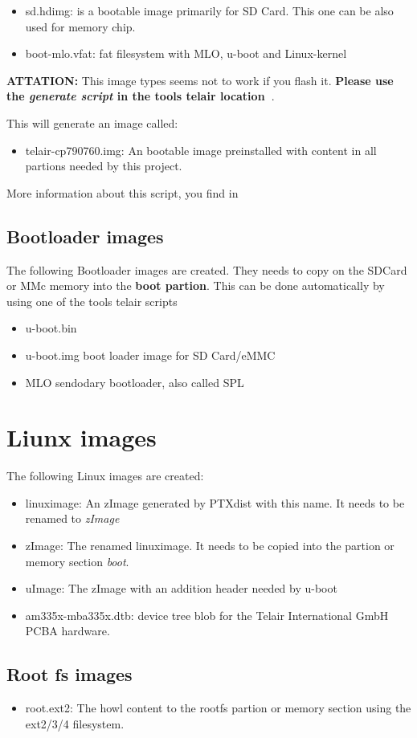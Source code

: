 \begin{itemize}
    \item sd.hdimg: is a bootable image primarily for SD Card.
        This one can be also used for memory chip.
    \item boot-mlo.vfat: fat filesystem with MLO, u-boot and Linux-kernel
\end{itemize}

\textbf{ATTATION:} This image types seems not to work if you flash it.
\textbf{Please use the \textit{generate script} in the tools telair
location~\footnotemark[2]}.

This will generate an image called:
\begin{itemize}
    \item telair-cp790760.img:  An bootable image preinstalled with content in
        all partions needed by this project.
\end{itemize}

More information about this script, you find in 

\subsection{Bootloader images}%
\label{sec:bootloader_images}

The following Bootloader images are created. They needs to copy on the SDCard
or MMc memory into the \textbf{boot partion}. This can be done automatically
by using one of the tools telair scripts~\footnotemark[3]

\begin{itemize}
    \item u-boot.bin
    \item u-boot.img boot loader image for SD Card/eMMC
    \item MLO sendodary bootloader, also called \gls{SPL}
\end{itemize}


\section{Liunx images}%
\label{sec:liunx_images}

The following Linux images are created:

\begin{itemize}
    \item linuximage: An zImage generated by PTXdist with this name. It needs to
        be renamed to \textit{zImage}
    \item zImage: The renamed linuximage. It needs to be copied into the
        partion or memory section \textit{boot}.
    \item uImage: The zImage with an addition header needed by u-boot
    \item am335x-mba335x.dtb: device tree blob for the Telair International GmbH
        \newline \gls{PCBA} hardware.
\end{itemize}


\subsection{Root fs images}%
\label{sec:rootfs_imges}

\begin{itemize}
    \item root.ext2: The howl content to the rootfs partion or memory section
    using the ext2/3/4 filesystem.
\end{itemize}


